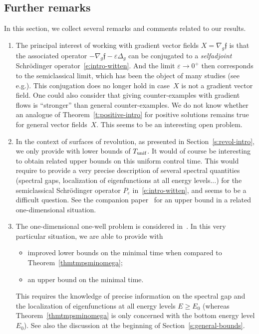\documentclass[10pt]{amsart}
\newcommand{\unif}{\textup{unif}}
\theoremstyle{definition}
\newcommand{\f}{\ensuremath{\mathfrak{f}}}
\newcommand\nablag{\nabla_{g}}
\let\eps\varepsilon
\providecommand{\eg}{e.g.}\providecommand{\ie}{i.e.}\providecommand{\etc}{etc.}
\begin{document}
\subsection{Further remarks}
In this section, we collect several remarks and comments related to our results.
\begin{enumerate}
\item The principal interest of working with gradient vector fields $X=\nablag\f$ is that the associated operator $-\nablag\f-\eps\Delta_g$ can be conjugated to a {\em selfadjoint} Schrödinger operator~\eqref{e:intro-witten}.
And the limit $\eps\to 0^+$ then corresponds to the semiclassical limit, which has been the object of many studies (see \eg \cite{Witten:82,Simon:83,HS84,HS:85,Helffer:booksemiclassic,CFKS,Allibert:98,HKN:04,HN:06}).
This conjugation does no longer hold in case~$X$ is not a gradient vector field.
One could also consider that giving counter-examples with gradient flows is ``stronger'' than general counter-examples.
We do not know whether an analogue of Theorem~\ref{t:positive-intro} for positive solutions remains true for general vector fields~$X$. This seems to be an interesting open problem.

\item In the context of surfaces of revolution, as presented in Section~\ref{s:revol-intro}, we only provide with lower bounds of $T_{\unif}$. It would of course be interesting to obtain related upper bounds on this uniform control time. This would require to provide a very precise description of several spectral quantities (spectral gaps, localization of eigenfunctions at all energy levels...) for the semiclassical Schrödinger operator $P_\eps$ in~\eqref{e:intro-witten}, and seems to be a difficult question.
See the companion paper~\cite{LL:20-1D} for an upper bound in a related one-dimensional situation.

\item The one-dimensional one-well problem is considered in~\cite{LL:20-1D}. In this very particular situation, we are able to provide with
\begin{itemize}
\item improved lower bounds on the minimal time when compared to Theorem~\ref{thmtmpsminomega};
\item an upper bound on the minimal time.
\end{itemize}
This requires the knowledge of precise information on the spectral gap and the localization of eigenfunctions at all energy levels $E\geq E_0$ (whereas Theorem~\ref{thmtmpsminomega} is only concerned with the bottom energy level $E_0$). See also the discussion at the beginning of Section~\ref{s:general-bounds}.


\end{enumerate}
\end{document}
